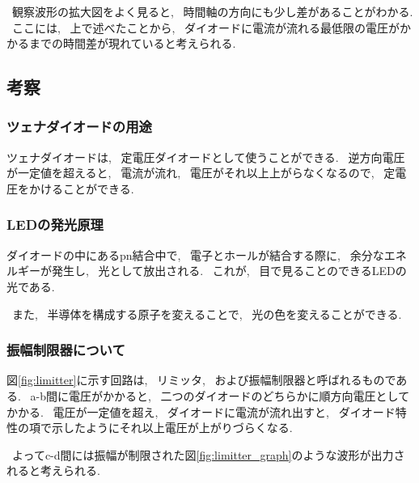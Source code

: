 \documentclass[uplatex,dvipdfmx,a4paper,js=standard, titlepage]{bxjsarticle}
\begin{document}
            ~観察波形の拡大図をよく見ると, ~時間軸の方向にも少し差があることがわかる.
            ~ここには, ~上で述べたことから,
            ~ダイオードに電流が流れる最低限の電圧がかかるまでの時間差が現れていると考えられる.
    \subsection{考察}
        \subsubsection{ツェナダイオードの用途}
            ツェナダイオードは, ~定電圧ダイオードとして使うことができる.
            ~逆方向電圧が一定値を超えると, ~電流が流れ,
            ~電圧がそれ以上上がらなくなるので, ~定電圧をかけることができる.
        \subsubsection{LEDの発光原理}
            ダイオードの中にあるpn結合中で, ~電子とホールが結合する際に,
            ~余分なエネルギーが発生し, ~光として放出される.
            ~これが, ~目で見ることのできるLEDの光である.

            ~また, ~半導体を構成する原子を変えることで, ~光の色を変えることができる.
        \subsubsection{振幅制限器について}
            図\ref{fig:limitter}に示す回路は, ~リミッタ, ~および振幅制限器と呼ばれるものである.
            ~a-b間に電圧がかかると, ~二つのダイオードのどちらかに順方向電圧としてかかる.
            ~電圧が一定値を超え, ~ダイオードに電流が流れ出すと,
            ~ダイオード特性の項で示したようにそれ以上電圧が上がりづらくなる.

            ~よってc-d間には振幅が制限された図\ref{fig:limitter_graph}のような波形が出力されると考えられる.
\end{document}
